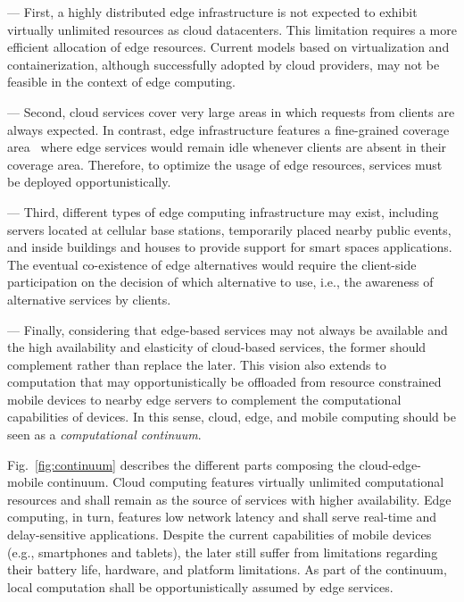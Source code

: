 
--- First, a highly distributed edge infrastructure is not expected to exhibit virtually unlimited resources as cloud datacenters. This limitation requires a more efficient allocation of edge resources. Current models based on virtualization and containerization, although successfully adopted by cloud providers, may not be feasible in the context of edge computing.


--- Second, cloud services cover very large areas in which requests from clients are always expected. In contrast, edge infrastructure features a fine-grained coverage area~\cite{Dehos14millimeter5g} where edge services would remain idle whenever clients are absent in their coverage area. Therefore, to optimize the usage of edge resources, services must be deployed opportunistically.



--- Third, different types of edge computing infrastructure may exist, including servers located at cellular base stations, temporarily placed nearby public events, and inside buildings and houses to provide support for smart spaces applications. The eventual co-existence of edge alternatives would require the client-side participation on the decision of which alternative to use, i.e., the awareness of alternative services by clients.




--- Finally, considering that edge-based services may not always be available and the high availability and elasticity of cloud-based services, the former should complement rather than replace the later. This vision also extends to computation that may opportunistically be offloaded from resource constrained mobile devices to nearby edge servers to complement the computational capabilities of devices. In this sense, cloud, edge, and mobile computing should be seen as a \textit{computational continuum}. 

Fig.~\ref{fig:continuum} describes the different parts composing the cloud-edge-mobile continuum. Cloud computing features virtually unlimited computational resources and shall remain as the source of services with higher availability. Edge computing, in turn, features low network latency and shall serve real-time and delay-sensitive applications. Despite the current capabilities of mobile devices (e.g., smartphones and tablets), the later still suffer from limitations regarding their battery life, hardware, and platform limitations. As part of the continuum, local computation shall be opportunistically assumed by edge services. 


